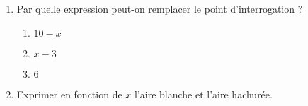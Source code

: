 
\begin{exercice}\label{exo2smath-0196}

\begin{center}                                                             
               
\end{center}

\begin{enumerate}
    \item
        Par quelle expression peut-on remplacer le point d'interrogation ?
        \begin{enumerate}
            \item
                \( 10-x\)
            \item
                \( x-3\)
            \item
                \( 6\)
        \end{enumerate}
    \item
        Exprimer en fonction de \( x\) l'aire blanche et l'aire hachurée.
\end{enumerate}

\end{exercice}
